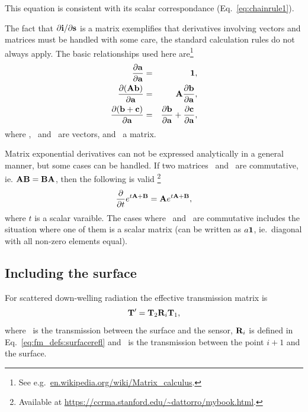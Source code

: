 This equation is consistent with its scalar correspondance
(Eq.~\ref{eq:chainrule1}).

The fact that $\partial\mathbf{i}/\partial{\bf s}$ is a matrix exemplifies that
derivatives involving vectors and matrices must be handled with some care, the
standard calculation rules do not always apply. The basic relationships used
here are\footnote{See e.g.\ \url{en.wikipedia.org/wiki/Matrix_calculus}.}
\begin{eqnarray}
  \frac{\partial\mathbf{a}}{\partial\mathbf{a}} &=& 
    \mathbf{1}, \\
  \frac{\partial(\mathbf{A}\mathbf{b})}{\partial\mathbf{a}} &=& 
    \mathbf{A}\frac{\partial\mathbf{b}}{\partial\mathbf{a}}, \\
  \frac{\partial(\mathbf{b}+\mathbf{c})}{\partial\mathbf{a}} &=& 
    \frac{\partial\mathbf{b}}{\partial\mathbf{a}}+
    \frac{\partial\mathbf{c}}{\partial\mathbf{a}},
\end{eqnarray}
where , \ and \ are vectors, and \ a
matrix.

Matrix exponential derivatives can not be expressed analytically in a general
manner, but some cases can be handled. If two matrices \ and
\ are commutative, ie. $\mathbf{A}\mathbf{B}=\mathbf{B}\mathbf{A}$,
then the following is valid \citep{Dattorro2011}\footnote{Available at
  \url{https://ccrma.stanford.edu/~dattorro/mybook.html}.}
\begin{equation}
  \label{eq:expmder}
  \frac{\partial}{\partial t} e^{t\mathbf{A}+\mathbf{B}} = 
       \mathbf{A}e^{t\mathbf{A}+\mathbf{B}},
\end{equation}
where $t$ is a scalar varaible.
The cases where \ and \ are commutative includes the
situation where one of them is a scalar matrix (can be written as $a\mathbf{1}$,
ie.\ diagonal with all non-zero elements equal).



\subsection{Including the surface}
%
For scattered down-welling radiation the effective transmission matrix is
\begin{equation}
  \mathbf{T}' = \mathbf{T}_{2}\mathbf{R}_i\mathbf{T}_{1},
\end{equation}
where \ is the transmission between the surface and the sensor,
$\mathbf{R}_i$ is defined in Eq.~\ref{eq:fm_defs:surfacerefl} and
\ is the transmission between the point $i+1$ and the surface.


